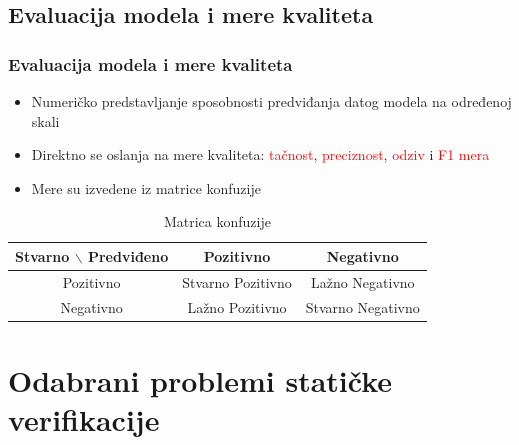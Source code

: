 \documentclass[11pt]{beamer}
\theoremstyle{definition}
\begin{document}
{\subsection{Evaluacija modela i mere kvaliteta}
\begin{frame}
\frametitle{Evaluacija modela i mere kvaliteta}
\begin{itemize}
\item Numeričko predstavljanje sposobnosti predviđanja datog modela na određenoj skali
\item Direktno se oslanja na mere kvaliteta: \textcolor{red}{tačnost}, \textcolor{red}{preciznost}, \textcolor{red}{odziv} i \textcolor{red}{F1 mera}
\item Mere su izvedene iz matrice konfuzije
\end{itemize}

\begin{table}[h]
	\centering
	\begin{tabular}{ |c|cc| }
		\hline
		Stvarno $\backslash$  Predviđeno & Pozitivno & Negativno \\
		\hline
		Pozitivno & Stvarno Pozitivno & Lažno Negativno \\
		Negativno & Lažno Pozitivno & Stvarno Negativno \\
		\hline
	\end{tabular}
	\caption{Matrica konfuzije}
	\label{table:matrica_konfuzije}
\end{table}

\end{frame}


\section{Odabrani problemi statičke verifikacije}
\label{sec:naslovN}

}
\end{document}
